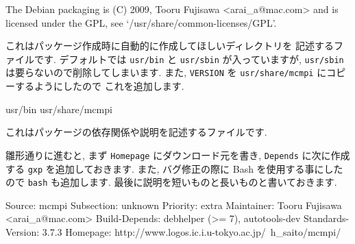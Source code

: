 \documentclass[mingoth,a4paper]{jsarticle}
\begin{document}
\begin{commandline}
\begin{commandline}
The Debian packaging is (C) 2009, Tooru Fujisawa <arai_a@mac.com> and
is licensed under the GPL, see `/usr/share/common-licenses/GPL'.
\end{commandline}


これはパッケージ作成時に自動的に作成してほしいディレクトリを
記述するファイルです.
デフォルトでは \verb|usr/bin| と \verb|usr/sbin| が入っていますが,
\verb|usr/sbin| は要らないので削除してしまいます.
また, \verb|VERSION| を \verb|usr/share/mcmpi| にコピーするようにしたので
これを追加します.

\begin{commandline}
usr/bin
usr/share/mcmpi
\end{commandline}


これはパッケージの依存関係や説明を記述するファイルです.

雛形通りに進むと, まず \verb|Homepage| にダウンロード元を書き,
\verb|Depends| に次に作成する \verb|gxp| を追加しておきます.
また, バグ修正の際に Bash を使用する事にしたので \verb|bash| も追加します.
最後に説明を短いものと長いものと書いておきます.

\begin{commandline}
Source: mcmpi
Subsection: unknown
Priority: extra
Maintainer: Tooru Fujisawa <arai_a@mac.com>
Build-Depends: debhelper (>= 7), autotools-dev
Standards-Version: 3.7.3
Homepage: http://www.logos.ic.i.u-tokyo.ac.jp/~h_saito/mcmpi/


\end{commandline}
\end{commandline}
\end{document}
